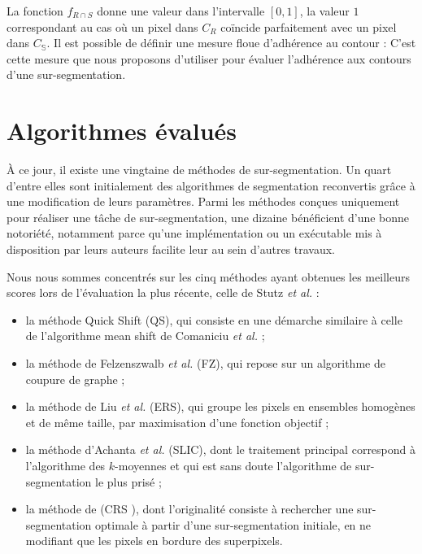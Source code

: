 La fonction $f_{R \cap S}$ donne une valeur  dans l'intervalle $[0,1]$, la valeur $1$ correspondant au cas où un pixel dans $C_{R}$ coïncide parfaitement avec un pixel dans  $C_{\mathbb{S}}$. Il est  possible de définir une mesure floue d'adhérence au contour :
C'est cette mesure que nous proposons d'utiliser pour évaluer l'adhérence aux contours d'une sur-segmentation. 
\section{Algorithmes évalués}

À ce jour, il existe une vingtaine de méthodes de sur-segmentation. Un quart d'entre elles sont initialement des algorithmes de segmentation  reconvertis grâce à une modification de leurs paramètres. Parmi les méthodes conçues  uniquement pour réaliser une tâche de sur-segmentation, une dizaine  bénéficient d'une bonne notoriété, notamment parce qu'une implémentation ou un exécutable mis à disposition par leurs auteurs facilite leur  au sein d'autres travaux. 

Nous nous sommes concentrés sur les cinq méthodes ayant obtenues les meilleurs scores lors de l'évaluation la plus récente, celle de Stutz \textit{et al.} \cite{stutz2015superpixel} : 
\begin{itemize}
\item la méthode Quick Shift \cite{vedaldi2008quick} (QS), qui consiste en une démarche similaire à celle de l'algorithme mean shift de Comaniciu \textit{et al.} \cite{comaniciu2002mean} ;
\item la méthode de Felzenszwalb \textit{et al.} \cite{felzenszwalb2004efficient} (FZ), qui repose sur un algorithme de coupure de graphe ;
\item la méthode de Liu \textit{et al.} \cite{liu2011entropy} (ERS), qui groupe les pixels en ensembles homogènes et de même taille, par maximisation d'une fonction objectif ;
\item la méthode d'Achanta \textit{et al.} \cite{achanta2012slic} (SLIC), dont le traitement principal correspond à l’algorithme des $k$-moyennes et qui est sans doute l'algorithme de sur-segmentation le plus prisé ;
\item la méthode de  (CRS ), dont l'originalité consiste à rechercher une sur-segmentation optimale à partir d'une sur-segmentation initiale, en ne modifiant que les pixels en bordure des superpixels. 
\end{itemize}

